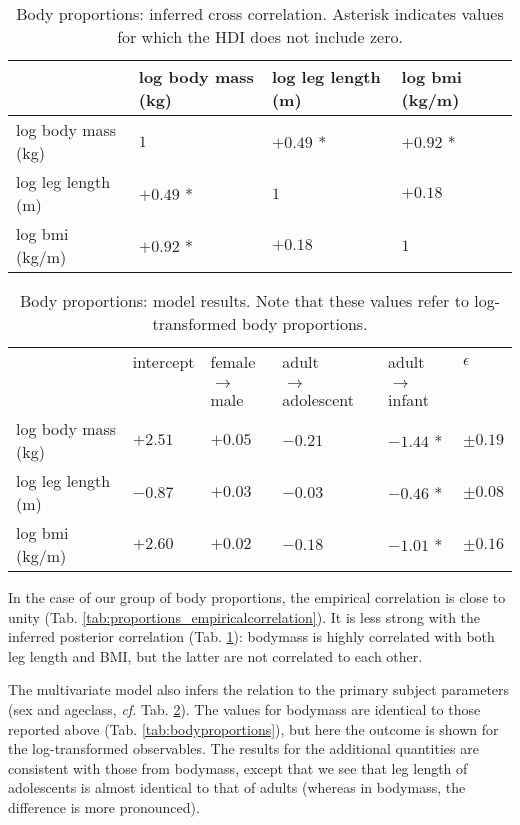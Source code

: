 \begin{table}[p]
\caption{\label{tab:proportions_correlation}Body proportions: inferred cross correlation. Asterisk indicates values for which the HDI does not include zero.}
\centering
\begin{tabular}{llll}
 & log body mass (kg) & log leg length (m) & log bmi (kg/m)\\[0pt]
\hline
log body mass (kg) & \(1\) & \(+0.49\) * & \(+0.92\) *\\[0pt]
log leg length (m) & \(+0.49\) * & \(1\) & \(+0.18\)\\[0pt]
log bmi (kg/m) & \(+0.92\) * & \(+0.18\) & \(1\)\\[0pt]
\end{tabular}
\end{table}

\begin{table}[p]
\caption{\label{tab:proportions_predictors}Body proportions: model results. Note that these values refer to log-transformed body proportions. }
\centering
\begin{tabular}{|l|l|l|l|l|l|}
\hline
 & intercept & female  & adult  & adult  & \(\epsilon\)\\[0pt]
 & & \(\rightarrow\) male & \(\rightarrow\) adolescent & \(\rightarrow\) infant & \\[0pt]
\hline
log body mass (kg) & \(+2.51\) & \(+0.05\) & \(-0.21\) & \(-1.44\) * & \(\pm 0.19\)\\[0pt]
log leg length (m) & \(-0.87\) & \(+0.03\) & \(-0.03\) & \(-0.46\) * & \(\pm 0.08\)\\[0pt]
log bmi (kg/m) & \(+2.60\) & \(+0.02\) & \(-0.18\) & \(-1.01\) * & \(\pm 0.16\)\\[0pt]
\hline
\end{tabular}
\end{table}


In the case of our group of body proportions, the empirical correlation is close to unity (Tab. \ref{tab:proportions_empiricalcorrelation}).
It is less strong with the inferred posterior correlation (Tab. \ref{tab:proportions_correlation}): bodymass is highly correlated with both leg length and BMI, but the latter are not correlated to each other.


The multivariate model also infers the relation to the primary subject parameters (sex and ageclass, \emph{cf.} Tab. \ref{tab:proportions_predictors}).
The values for bodymass are identical to those reported above (Tab. \ref{tab:bodyproportions}), but here the outcome is shown for the log-transformed observables.
The results for the additional quantities are consistent with those from bodymass, except that we see that leg length of adolescents is almost identical to that of adults (whereas in bodymass, the difference is more pronounced).

